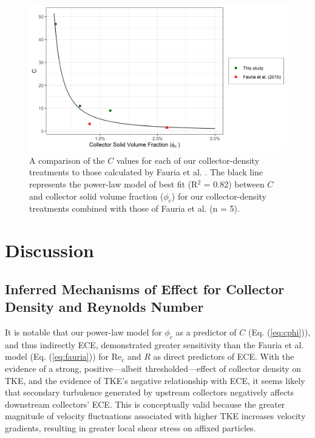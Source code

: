 \documentclass[geosciences,article,submit,moreauthors,pdftex]{Definitions/mdpi}
\newcommand\Rey{\mathrm{Re}}
\begin{document}
\begin{figure}[H]
\centering
\includegraphics[width=5in]{../pics/cphiplot.png}
\caption{A comparison of the $C$ values for each of our collector-density treatments to those calculated by Fauria et al. \cite{Fauria_2015}. The black line represents the power-law model of best fit (R$^2$ = 0.82) between $C$ and collector solid volume fraction ($\phi_c$) for our collector-density treatments combined with those of Fauria et al. (n = 5).}
\label{fig:cphi}
\end{figure}   

\section{Discussion}

\subsection{Inferred Mechanisms of Effect for Collector Density and Reynolds Number}

It is notable that our power-law model for $\phi_c$ as a predictor of $C$ (Eq. (\ref{eq:cphi})), and thus indirectly ECE, demonstrated greater sensitivity than the Fauria et al. \cite{Fauria_2015} model (Eq. (\ref{eq:fauria})) for $\Rey_c$ and $R$ as direct predictors of ECE. With the evidence of a strong, positive---albeit thresholded---effect of collector density on TKE, and the evidence of TKE's negative relationship with ECE, it seems likely that secondary turbulence generated by upstream collectors negatively affects downstream collectors' ECE. This is conceptually valid because the greater magnitude of velocity fluctuations associated with higher TKE increases velocity gradients, resulting in greater local shear stress on affixed particles.
\end{document}
